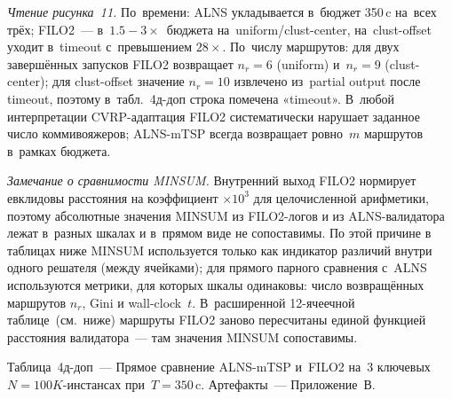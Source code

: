 \documentclass[a4paper,14pt]{extreport}
\begin{document}
\noindent\textit{Чтение рисунка~11.} По~времени: ALNS укладывается в~бюджет 350\,c на~всех трёх; FILO2~--- в~$1.5{-}3\times$~бюджета на~uniform/clust-center, на~clust-offset уходит в~timeout с~превышением $28\times$. По~числу маршрутов: для двух завершённых запусков FILO2 возвращает $n_r=6$ (uniform) и~$n_r=9$ (clust-center); для clust-offset значение $n_r=10$ извлечено из~partial output после timeout, поэтому в~табл.~4д-доп строка помечена «timeout». В~любой интерпретации CVRP-адаптация FILO2 систематически нарушает заданное число коммивояжеров; ALNS-mTSP всегда возвращает ровно~$m$ маршрутов в~рамках бюджета.


\medskip
\textit{Замечание о сравнимости MINSUM.} Внутренний выход FILO2 нормирует евклидовы расстояния на коэффициент $\times 10^3$ для целочисленной арифметики, поэтому абсолютные значения MINSUM из FILO2-логов и из ALNS-валидатора лежат в~разных шкалах и в~прямом виде не сопоставимы. По этой причине в таблицах ниже MINSUM используется только как индикатор различий внутри одного решателя (между ячейками); для прямого парного сравнения с~ALNS используются метрики, для которых шкалы одинаковы: число возвращённых маршрутов $n_r$, $\mathrm{Gini}$ и wall-clock~$t$. В~расширенной 12-ячеечной таблице~(см.~ниже) маршруты FILO2 заново пересчитаны единой функцией расстояния валидатора~--- там значения MINSUM сопоставимы.

\medskip
\noindent Таблица~4д-доп~--- Прямое сравнение ALNS-mTSP и~FILO2 на~3 ключевых $N=100K$-инстансах при~$T=350$\,c. Артефакты~--- Приложение~В.
\end{document}
